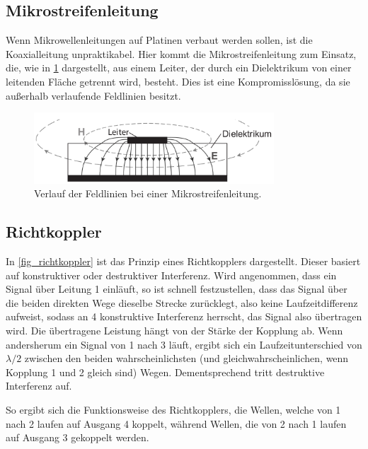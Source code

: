 \documentclass[
	a4paper,
	12pt,
	pagesize,
	ngerman
]{scrartcl}
\begin{document}
	\subsection{Mikrostreifenleitung}

	Wenn Mikrowellenleitungen auf Platinen verbaut werden sollen, ist die Koaxialleitung unpraktikabel.
	Hier kommt die Mikrostreifenleitung zum Einsatz, die, wie in \cref{fig_mikrostreifen} dargestellt, aus einem Leiter, der durch ein Dielektrikum von einer leitenden Fläche getrennt wird, besteht.
	Dies ist eine Kompromisslösung, da sie außerhalb verlaufende Feldlinien besitzt.

	\begin{figure}[H]
		\includegraphics[width=0.8\textwidth]{img/mirkostreifen}
		\centering
		\caption{
			Verlauf der Feldlinien bei einer Mikrostreifenleitung. \cite{Anleitung}
		}
		\label{fig_mikrostreifen}
		\centering
	\end{figure}


	\subsection{Richtkoppler} \label{ss_richt}

	In \cref{fig_richtkoppler} ist das Prinzip eines Richtkopplers dargestellt.
	Dieser basiert auf konstruktiver oder destruktiver Interferenz.
	Wird angenommen, dass ein Signal über Leitung 1 einläuft, so ist schnell festzustellen, dass das Signal über die beiden direkten Wege dieselbe Strecke zurücklegt, also keine Laufzeitdifferenz aufweist, sodass an 4 konstruktive Interferenz herrscht, das Signal also übertragen wird. %
	Die übertragene Leistung hängt von der Stärke der Kopplung ab.
	Wenn andersherum ein Signal von 1 nach 3 läuft, ergibt sich ein Laufzeitunterschied von $\lambda/2$ zwischen den beiden wahrscheinlichsten (und gleichwahrscheinlichen, wenn Kopplung 1 und 2 gleich sind) Wegen.
	Dementsprechend tritt destruktive Interferenz auf.

	So ergibt sich die Funktionsweise des Richtkopplers, die Wellen, welche von 1 nach 2 laufen auf Ausgang 4 koppelt, während Wellen, die von 2 nach 1 laufen auf Ausgang 3 gekoppelt werden.
\end{document}
